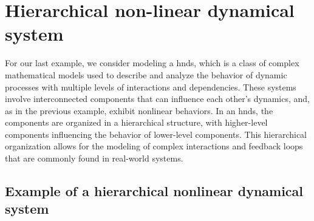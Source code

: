 \section{Hierarchical non-linear dynamical system}\label{chapter-05:section:hierarchical-filter}

For our last example, we consider modeling a \ac{hnds}, 
which is a class of complex mathematical models used to describe and analyze the
behavior of dynamic processes with multiple levels of interactions and dependencies.
These systems involve interconnected components that can influence each other's dynamics, and, as in the previous example, exhibit nonlinear behaviors.
In an \ac{hnds}, the components are organized in a hierarchical structure, with higher-level
components influencing the behavior of lower-level components.
This hierarchical organization allows for the modeling of complex interactions and feedback
loops that are commonly found in real-world systems.

\subsection{Example of a hierarchical nonlinear dynamical system}


